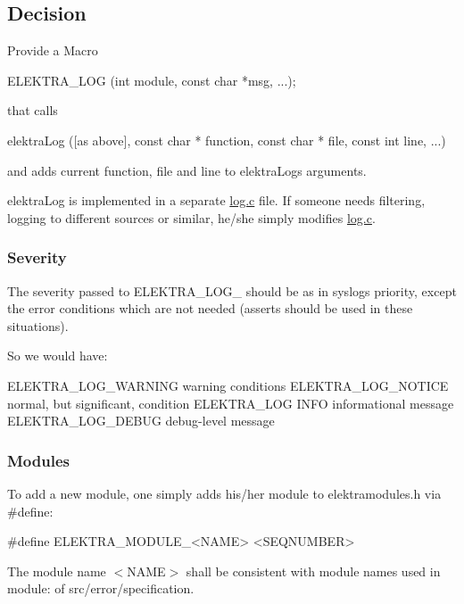 \subsection*{Decision}

Provide a Macro \begin{DoxyVerb}ELEKTRA_LOG (int module, const char *msg, ...);
\end{DoxyVerb}


that calls \begin{DoxyVerb}elektraLog ([as above], const char * function, const char * file,
        const int line, ...)
\end{DoxyVerb}


and adds current function, file and line to {\ttfamily elektra\+Log}\textquotesingle{}s arguments.

{\ttfamily elektra\+Log} is implemented in a separate {\ttfamily \hyperlink{log_8c}{log.\+c}} file. If someone needs filtering, logging to different sources or similar, he/she simply modifies {\ttfamily \hyperlink{log_8c}{log.\+c}}.

\subsubsection*{Severity}

The severity passed to {\ttfamily E\+L\+E\+K\+T\+R\+A\+\_\+\+L\+O\+G\+\_\+} should be as in syslog\textquotesingle{}s priority, except the error conditions which are not needed (asserts should be used in these situations).

So we would have\+: \begin{DoxyVerb}    ELEKTRA_LOG_WARNING    warning conditions
    ELEKTRA_LOG_NOTICE     normal, but significant, condition
    ELEKTRA_LOG            INFO    informational message
    ELEKTRA_LOG_DEBUG      debug-level message
\end{DoxyVerb}


\subsubsection*{Modules}

To add a new module, one simply adds his/her module to {\ttfamily elektramodules.\+h} via {\ttfamily \#define}\+: \begin{DoxyVerb}#define ELEKTRA_MODULE_<NAME> <SEQNUMBER>
\end{DoxyVerb}


The module name {\ttfamily $<$N\+A\+ME$>$} shall be consistent with module names used in {\ttfamily module\+:} of {\ttfamily src/error/specification}.

